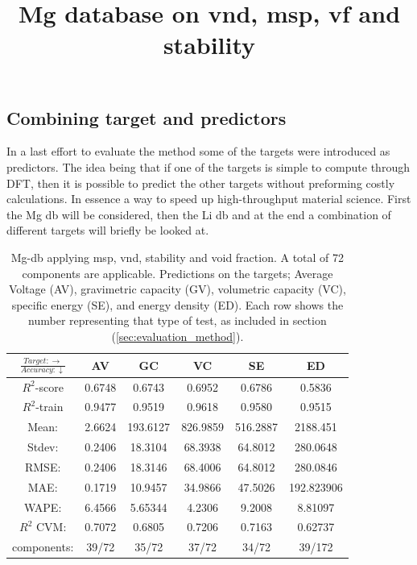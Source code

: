 \subsection{Combining target and predictors}
In a last effort to evaluate the method some of the targets were introduced as predictors. The idea being that if one of the targets is simple to compute through DFT, then it is possible to predict the other targets without preforming costly calculations. In essence a way to speed up high-throughput material science. First the Mg db will be considered, then the Li db and at the end a combination of different targets will briefly be looked at. 


\begin{table}[H]%
\scriptsize
\centering
\caption{Mg-db applying msp, vnd, stability and void fraction. A total of 72 components are applicable. Predictions on the targets; Average Voltage (AV), gravimetric capacity (GV), volumetric capacity (VC), specific energy (SE), and energy density (ED). Each row shows the number representing that type of test, as included in section (\ref{sec:evaluation_method}).}
\title{Mg database on vnd, msp, vf and stability}
\begin{tabular}{|c|c|c|c|c|c|}
	\hline 
	$\frac{Target: \rightarrow}{Accuracy:\downarrow} $ & AV & GC & VC & SE & ED 
	 \\ 
	\hline
	$R^2$-score 	& 0.6748 & 0.6743 & 0.6952 & 0.6786 &  0.5836\\ 
	\hline 
	$R^2$-train 	& 0.9477 & 0.9519 & 0.9618 & 0.9580 &  0.9515 \\ 
	\hline
	Mean: 	 	& 2.6624	&193.6127&826.9859& 516.2887& 2188.451\\
	\hline 
	Stdev:	 	& 0.2406	&18.3104	&68.3938 	&64.8012	& 280.0648\\
	\hline 
	RMSE: 		&0.2406& 18.3146 &  68.4006 & 64.8012 &280.0846\\ 
	\hline
	MAE: 		& 0.1719 & 10.9457& 34.9866 & 47.5026 & 192.823906 \\ 
	\hline
	WAPE: 		& 6.4566 & 5.65344 & 4.2306  & 9.2008 & 8.81097 \\
	\hline
	$R^2$ CVM: 	& 0.7072 	& 0.6805 	& 0.7206 &  0.7163 &0.62737 \\
	\hline
	components: 	& 39/72 	& 35/72 	& 37/72 	 & 34/72 	&39/172 \\
	\hline
\end{tabular}
\label{tab:mg-vnd-msp-vf-stability}
\end{table}


